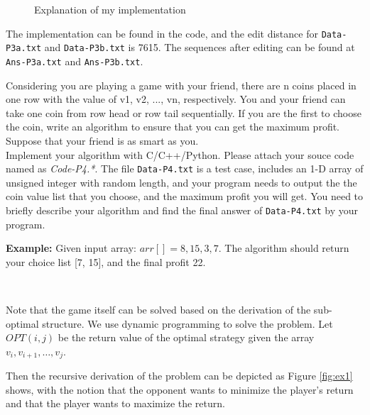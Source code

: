 \begin{exercise}
\begin{solution}
\begin{figure}
    \caption{Explanation of my implementation \label{fig:ex5}}
  \end{figure}

  The implementation can be found in the code, and the edit distance for \texttt{Data-P3a.txt} and \texttt{Data-P3b.txt} is 7615. The sequences after editing can be found at \texttt{Ans-P3a.txt} and \texttt{Ans-P3b.txt}.

  \end{solution}
  \label{ex3}
\end{exercise}



\begin{exercise}[]{Considering you are playing a game with your friend, there are n coins placed in one row with the value of v1, v2, ..., vn, respectively. You and your friend can take one coin from row head or row tail sequentially. If you are the first to choose the coin, write an algorithm to ensure that you can get the maximum profit. Suppose that your friend is as smart as you. 
    ~\\
    Implement your algorithm with C/C++/Python. Please attach your souce code named as {\color{red}\emph{Code-P4.*}}. The file \texttt{Data-P4.txt} is a test case, includes an 1-D array of unsigned integer with random length, and your program needs to output the the coin value list that you choose, and the maximum profit you will get. You need to briefly describe your algorithm and find the final answer of \texttt{Data-P4.txt} by your program.
    
    \textbf{Example:} Given input array: $arr[]={8, 15, 3, 7}$. The algorithm should return your choice list [7, 15], and the final profit 22. 
    
}
  \begin{solution}
  \par{~}

  Note that the game itself can be solved based on the derivation of the sub-optimal structure. We use dynamic programming to solve the problem. Let $OPT(i,j)$ be the return value of the optimal strategy given the array $v_i,v_{i+1},\ldots,v_{j}$.

  Then the recursive derivation of the problem can be depicted as Figure \ref{fig:ex1} shows, with the notion that the opponent wants to minimize the player's return and that the player wants to maximize the return.


\end{solution}
\end{exercise}
